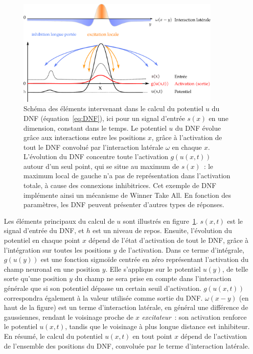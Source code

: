 \documentclass[../main]{subfiles}
\begin{document}
\begin{figure}
	\centering\includegraphics[width=0.9\textwidth]{DNF.pdf}
	\caption{Schéma des éléments intervenant dans le calcul du potentiel $u$ du DNF (équation~\ref{eq:DNF}), ici pour un signal d'entrée $s(x)$ en une dimension, constant dans le temps.
	Le potentiel $u$ du DNF évolue grâce aux interactions entre les positions $x$, grâce à l'activation de tout le DNF convolué par l'interaction latérale $\omega$ en chaque $x$.
	L'évolution du DNF concentre toute l'activation $g(u(x,t))$ autour d'un seul point, qui se situe au maximum de $s(x)$~: le maximum local de gauche n'a pas de représentation dans l'activation totale, à cause des connexions inhibitrices.
	Cet exemple de DNF implémente ainsi un mécanisme de Winner Take All. En fonction des paramètres, les DNF peuvent présenter d'autres types de réponses. \label{fig:DNF}
	}
\end{figure}

Les éléments principaux du calcul de $u$ sont illustrés en figure~\ref{fig:DNF}.
$s(x,t)$ est le signal d'entrée du DNF, et $h$ est un niveau de repos.
Ensuite, l'évolution du potentiel en chaque point $x$ dépend de l'état d'activation de tout le DNF, grâce à l'intégration sur toutes les positions $y$ de l'activation.
Dans ce terme d'intégrale, $g(u(y))$ est une fonction sigmoïde centrée en zéro représentant l'activation du champ neuronal en une position $y$. Elle s'applique sur le potentiel $u(y)$, de telle sorte qu'une position $y$ du champ ne sera prise en compte dans l'interaction générale que si son potentiel dépasse un certain seuil d'activation. $g(u(x,t))$ correspondra également à la valeur utilisée comme sortie du DNF.
$\omega(x-y)$ (en haut de la figure) est un terme d'interaction latérale, en général une différence de gaussiennes, rendant le voisinage proche de $x$ \emph{excitateur}~: son activation renforce le potentiel $u(x,t)$, tandis que le voisinage à plus longue distance est inhibiteur.
En résumé, le calcul du potentiel $u(x,t)$ en tout point $x$ dépend de l'activation de l'ensemble des positions du DNF, convoluée par le terme d'interaction latérale.
\end{document}
